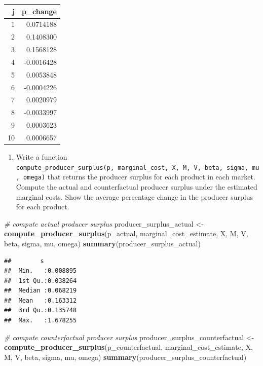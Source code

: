 \documentclass[]{book}
\newenvironment{Shaded}{\begin{snugshade}}{\end{snugshade}}
\newcommand{\KeywordTok}[1]{\textcolor[rgb]{0.13,0.29,0.53}{\textbf{#1}}}
\newcommand{\StringTok}[1]{\textcolor[rgb]{0.31,0.60,0.02}{#1}}
\newcommand{\CommentTok}[1]{\textcolor[rgb]{0.56,0.35,0.01}{\textit{#1}}}
\newcommand{\NormalTok}[1]{#1}
\providecommand{\tightlist}{%
  \setlength{\itemsep}{0pt}\setlength{\parskip}{0pt}}
\begin{document}
\begin{tabular}{r|r}
\hline
j & p\_change\\
\hline
1 & 0.0714188\\
\hline
2 & 0.1408300\\
\hline
3 & 0.1568128\\
\hline
4 & -0.0016428\\
\hline
5 & 0.0053848\\
\hline
6 & -0.0004226\\
\hline
7 & 0.0020979\\
\hline
8 & -0.0033997\\
\hline
9 & 0.0003623\\
\hline
10 & 0.0006657\\
\hline
\end{tabular}

\begin{enumerate}
\def\labelenumi{\arabic{enumi}.}
\setcounter{enumi}{2}
\tightlist
\item
  Write a function
  \texttt{compute\_producer\_surplus(p,\ marginal\_cost,\ X,\ M,\ V,\ beta,\ sigma,\ mu,\ omega)}
  that returns the producer surplus for each product in each market.
  Compute the actual and counterfactual producer surplus under the
  estimated marginal costs. Show the average percentage change in the
  producer surplus for each product.
\end{enumerate}

\begin{Shaded}
\begin{Highlighting}[]
\CommentTok{# compute actual producer surplus}
\NormalTok{producer_surplus_actual <-}
\StringTok{  }\KeywordTok{compute_producer_surplus}\NormalTok{(p_actual, marginal_cost_estimate, X, M, V, beta, sigma, mu, omega)}
\KeywordTok{summary}\NormalTok{(producer_surplus_actual)}
\end{Highlighting}
\end{Shaded}

\begin{verbatim}
##        s           
##  Min.   :0.008895  
##  1st Qu.:0.038264  
##  Median :0.068219  
##  Mean   :0.163312  
##  3rd Qu.:0.135748  
##  Max.   :1.678255
\end{verbatim}

\begin{Shaded}
\begin{Highlighting}[]
\CommentTok{# compute counterfactual producer surplus}
\NormalTok{producer_surplus_counterfactual <-}
\StringTok{  }\KeywordTok{compute_producer_surplus}\NormalTok{(p_counterfactual, marginal_cost_estimate, X, M, V, beta, sigma, mu, omega)}
\KeywordTok{summary}\NormalTok{(producer_surplus_counterfactual)}
\end{Highlighting}
\end{Shaded}
\end{document}
